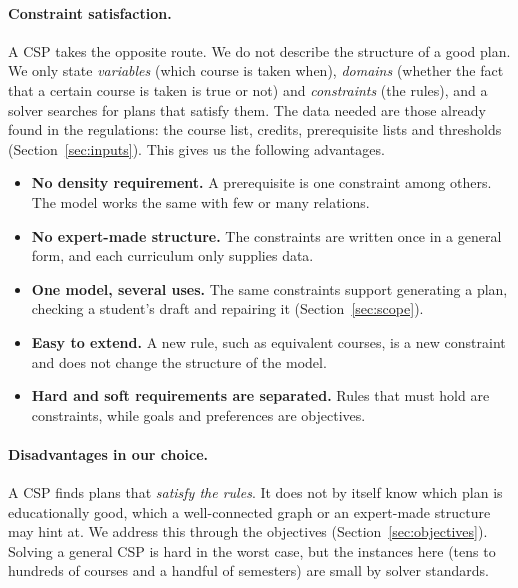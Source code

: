 \documentclass[10pt,a4paper]{article}
\begin{document}
\paragraph{Constraint satisfaction.}
A CSP takes the opposite route. We do not describe the structure of a good plan. We only state \emph{variables} (which course is taken when), \emph{domains} (whether the fact that a certain course is taken is true or not) and \emph{constraints} (the rules), and a solver searches for plans that satisfy them. The data needed are those already found in the regulations: the course list, credits, prerequisite lists and thresholds (Section~\ref{sec:inputs}). This gives us the following advantages.
\begin{itemize}
      \item \textbf{No density requirement.} A prerequisite is one constraint among others. The model works the same with few or many relations.
      \item \textbf{No expert-made structure.} The constraints are written once in a general form, and each curriculum only supplies data.
      \item \textbf{One model, several uses.} The same constraints support generating a plan, checking a student's draft and repairing it (Section~\ref{sec:scope}).
      \item \textbf{Easy to extend.} A new rule, such as equivalent courses, is a new constraint and does not change the structure of the model.
      \item \textbf{Hard and soft requirements are separated.} Rules that must hold are constraints, while goals and preferences are objectives.
\end{itemize}

\paragraph{Disadvantages in our choice.}
A CSP finds plans that \emph{satisfy the rules}. It does not by itself know which plan is educationally good, which a well-connected graph or an expert-made structure may hint at. We address this through the objectives (Section~\ref{sec:objectives}). Solving a general CSP is hard in the worst
case, but the instances here (tens to hundreds of courses and a handful of semesters) are small by solver standards.
\end{document}
